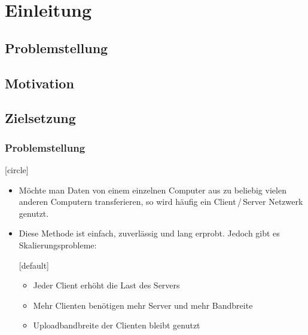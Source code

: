 
\section{Einleitung}

\subsection{Problemstellung}
\subsection{Motivation}
\subsection{Zielsetzung}

\begin{frame}
  \frametitle{Problemstellung}
	
  [circle]
  \begin{itemize}
	  \item Möchte man Daten von einem einzelnen Computer aus zu beliebig vielen anderen Computern transferieren, so wird häufig ein Client\,/\,Server Netzwerk genutzt. 
	  \item Diese Methode ist einfach, zuverlässig und lang erprobt. Jedoch gibt es Skalierungsprobleme:

 	  [default]
	  \begin{itemize}
	    \item Jeder Client erhöht die Last des Servers
	    \item Mehr Clienten benötigen mehr Server und mehr Bandbreite
	    \item Uploadbandbreite der Clienten bleibt genutzt
	 
	  \end{itemize}
  \end{itemize}
\end{frame}


